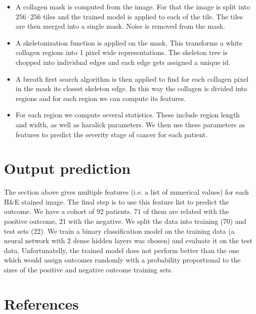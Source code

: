 \documentclass{article}
\begin{document}
\begin{itemize}
    
\item A collagen mask is computed from the image. For that the image is split
      into $256 \cdot 256$ tiles and the trained model is applied to each
      of the tile. The tiles are then merged into a single mask. Noise is
      removed from the mask.

\item A skeletonization function is applied on the mask. This transforms
      a white collagen regions into 1 pixel wide representations. The skeleton
      tree is chopped into individual edges and each edge gets assigned a
      unique id.

\item A breath first search algorithm is then applied to find for each collagen
      pixel in the mask its closest skeleton edge. In this way the collagen
      is divided into regions and for each region we can compute its
      features.

\item For each region we compute several statistics. These include region
      length and width, as well as haralick parameters. We then use these
      parameters as features to predict the severity stage of cancer for
      each patient.

\end{itemize}


\section{Output prediction}

The section above gives multiple features (i.e. a list of numerical values) for
each H\&E stained image. The final step is to use this feature list to predict
the outcome. We have a cohort of 92 patients. 71 of them are related with the
positive outcome, 21 with the negative. We split the data into training (70) and
test sets (22). We train a binary classification model on the training data
(a neural network with 2 dense hidden layers was chosen) and evaluate it on the
test data. Unfortunatelly, the trained model does not perform better than
the one which would assign outcomes randomly with a probability proportional
to the sizes of the positive and negative outcome training sets.

\section{References}
\end{document}
